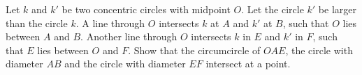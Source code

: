 Let $k$ and $k'$ be two concentric circles with midpoint $O$. Let the circle $k'$ be larger
than the circle $k$. A line through $O$ intersects $k$ at $A$ and $k'$ at $B$, such that $O$ lies
between $A$ and $B$. Another line through $O$ intersects $k$ in $E$ and $k'$ in $F$, such
that $E$ lies between $O$ and $F$. Show that the circumcircle of $OAE$, the circle with
diameter $AB$ and the circle with diameter $EF$ intersect at a point.